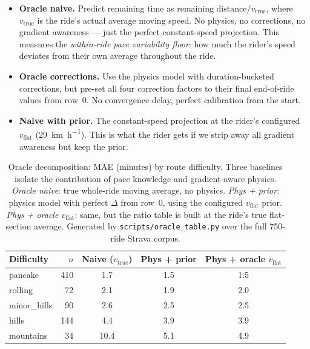 \documentclass[11pt,a4paper]{article}
\begin{document}
\begin{itemize}
\item \textbf{Oracle naive.} Predict remaining time as
  $\text{remaining distance} / v_{\text{true}}$, where
  $v_{\text{true}}$ is the ride's actual average moving speed. No
  physics, no corrections, no gradient awareness --- just the perfect
  constant-speed projection. This measures the \emph{within-ride pace
  variability floor}: how much the rider's speed deviates from their
  own average throughout the ride.
\item \textbf{Oracle corrections.} Use the physics model with
  duration-bucketed corrections, but pre-set all four correction
  factors to their final end-of-ride values from row~0. No
  convergence delay, perfect calibration from the start.
\item \textbf{Naive with prior.} The constant-speed projection at the
  rider's configured $v_\text{flat}$ (\SI{29}{\km\per\hour}). This is
  what the rider gets if we strip away all gradient awareness but keep
  the prior.
\end{itemize}

\begin{table}[ht]
\centering
\caption{Oracle decomposition: MAE (minutes) by route difficulty.
Three baselines isolate the contribution of pace knowledge and
gradient-aware physics.
\emph{Oracle naive}: true whole-ride moving average, no physics.
\emph{Phys + prior}: physics model with perfect $\Delta$ from row~0,
using the configured $v_{\text{flat}}$ prior.
\emph{Phys + oracle $v_{\text{flat}}$}: same, but the ratio table is
built at the ride's true flat-section average.
Generated by \texttt{scripts/oracle\_table.py} over the full
750-ride Strava corpus.}
\label{tab:oracle}
\begin{tabular}{@{} l r S[table-format=2.1] S[table-format=2.1] S[table-format=2.1] @{}}
\toprule
{Difficulty} & {$n$} & {Naive ($v_\text{true}$)}
  & {Phys + prior} & {Phys + oracle $v_\text{flat}$} \\
\midrule
pancake      & 410 & 1.7 & 1.5 & 1.5 \\
rolling      &  72 & 2.1 & 1.9 & 2.0 \\
minor\_hills &  90 & 2.6 & 2.5 & 2.5 \\
hills        & 144 & 4.4 & 3.9 & 3.9 \\
mountains    &  34 & 10.4 & 5.1 & 4.9 \\
\bottomrule
\end{tabular}
\end{table}
\end{document}
